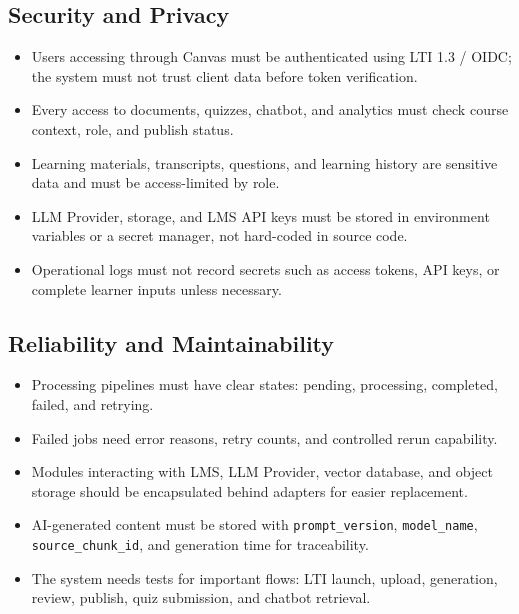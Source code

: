 \subsection{Security and Privacy}
\label{subsec:bao-mat-quyen-rieng-tu}

\begin{itemize}
    \item Users accessing through Canvas must be authenticated using LTI 1.3 /
          OIDC; the system must not trust client data before token
          verification.
    \item Every access to documents, quizzes, chatbot, and analytics must check
          course context, role, and publish status.
    \item Learning materials, transcripts, questions, and learning history are
          sensitive data and must be access-limited by role.
    \item LLM Provider, storage, and LMS API keys must be stored in environment
          variables or a secret manager, not hard-coded in source code.
    \item Operational logs must not record secrets such as access tokens, API
          keys, or complete learner inputs unless necessary.
\end{itemize}

\subsection{Reliability and Maintainability}
\label{subsec:do-tin-cay-kha-nang-bao-tri}

\begin{itemize}
    \item Processing pipelines must have clear states: pending, processing,
          completed, failed, and retrying.
    \item Failed jobs need error reasons, retry counts, and controlled rerun
          capability.
    \item Modules interacting with LMS, LLM Provider, vector database, and
          object storage should be encapsulated behind adapters for easier
          replacement.
    \item AI-generated content must be stored with \texttt{prompt\_version},
          \texttt{model\_name}, \texttt{source\_chunk\_id}, and generation
          time for traceability.
    \item The system needs tests for important flows: LTI launch, upload,
          generation, review, publish, quiz submission, and chatbot retrieval.
\end{itemize}

